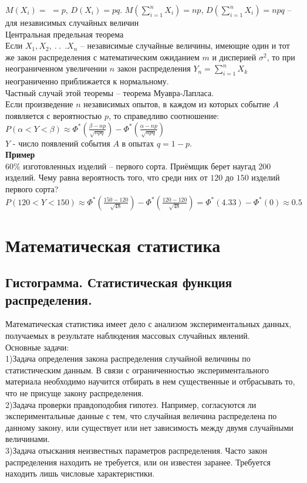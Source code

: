 \documentclass[russian, 12pt, fleqn,x11names]{article}
\begin{document}
$M(X_i) = $ $=p$, $D(X_i) = pq$.
$M(\displaystyle{\sum\limits_{i = 1}^{n}} X_i) = np$, $D(\displaystyle{\sum\limits_{i = 1}^{n}} X_i) = npq$ -- для независимых случайных величин\\
$\textbf{Центральная предельная теорема}$\\
Если $X_1,$$ X_2,\ .\ .\ \ . X_n$ -- независимые случайные  величины, имеющие один и тот же закон распределения с математическим ожиданием $m$ и дисперией $\sigma^2$,
то при неограниченном увеличении $n$ закон распределения $Y_n = \displaystyle{\sum\limits_{i = 1}^{n}} X_k$ неограниченно приближается к нормальному.\\
Частный случай этой теоремы -- теорема Муавра-Лапласа.\\
Если произведение $n$ независимых опытов, в каждом из которых событие $A$ появляется с вероятностью $p$, то справедливо соотношение:
\\ $P(\alpha < Y < \beta) \approx \Phi^*(\frac{\beta - np}{\sqrt{npq}}) - \Phi^*(\frac{\alpha - np}{\sqrt{npq}})$\\
$Y$ - число появлений события $A$  в опытах $q = 1 - p$.\\
\textbf{Пример} \\
$60 \%$ изготовленных изделий -- первого сорта. Приёмщик берет наугад 200 изделий. Чему равна вероятность того, что среди них от $120$ до $150$ изделий первого сорта?\\
$P(120 < Y < 150) \approx \Phi^*(\frac{150-120}{\sqrt{48}}) - \Phi^*(\frac{120 - 120}{\sqrt{48}}) = \Phi^*(4.33) - \Phi^*(0)  \approx 0.5$ \\
\newpage
\section{Математическая статистика}
\subsection{Гистограмма. Статистическая функция распределения.}
\noindent
Математическая статистика имеет дело с анализом экспериментальных данных, получаемых в результате наблюдения массовых случайных явлений.\\
Основные задачи:\\
1)Задача определения закона распределения случайной величины по статистическим данным. В связи с ограниченностью 
экспериментального материала необходимо научится отбирать в нем существенные и отбрасывать то, что не присуще закону распределения.\\
2)Задача проверки правдоподобия гипотез. Например, согласуются ли 
экспериментальные данные с тем, что случайная величина распределена по данному закону, или существует или нет зависимость между двумя случайными величинами.\\
3)Задача отыскания неизвестных параметров распределения. Часто закон распределения находить не требуется, или он известен заранее. Требуется находить лишь числовые характеристики.\\
\end{document}
